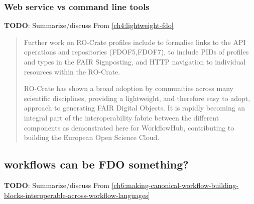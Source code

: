 \subsubsection{Web service vs command line tools}

\textbf{TODO}: Summarize/discuss 
From \vref{ch4:lightweight-fdo}

\begin{quotation} 
  Further work on RO-Crate profiles include to formalise links to the API
  operations and repositories (FDOF5,FDOF7), to include PIDs of
  profiles and types in the FAIR Signposting, and HTTP navigation to
  individual resources within the RO-Crate.

  RO-Crate has shown a broad adoption by communities across many
  scientific disciplines, providing a lightweight, and therefore easy to
  adopt, approach to generating FAIR Digital Objects.
  It is rapidly
  becoming an integral part of the interoperability fabric between the
  different components as demonstrated here for WorkflowHub, contributing
  to building the European Open Science Cloud.
\end{quotation}


\subsection{workflows can be FDO something?}

\textbf{TODO}: Summarize/discuss 
From \vref{ch6:making-canonical-workflow-building-blocks-interoperable-across-workflow-languages}

